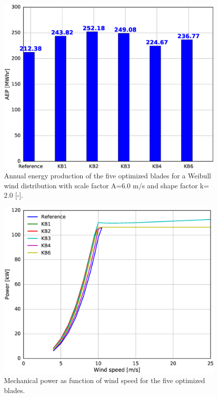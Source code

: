 \begin{figure}[pht]
\begin{center}
	\includegraphics[width=.85\linewidth]{figures/KBcomp_AEPcomp.eps}
\end{center}
\caption{Annual energy production of the five optimized blades for a Weibull wind distribution with scale factor A=6.0 m/s and shape factor k= 2.0 [-].}
\label{fig:KB_AEP}
\end{figure}

\begin{figure}[pht]
\begin{center}
	\includegraphics[width=.85\linewidth]{figures/KBcomp_power.eps}
\end{center}
\caption{Mechanical power as function of wind speed for the five optimized blades.}
\label{fig:power}
\end{figure}


